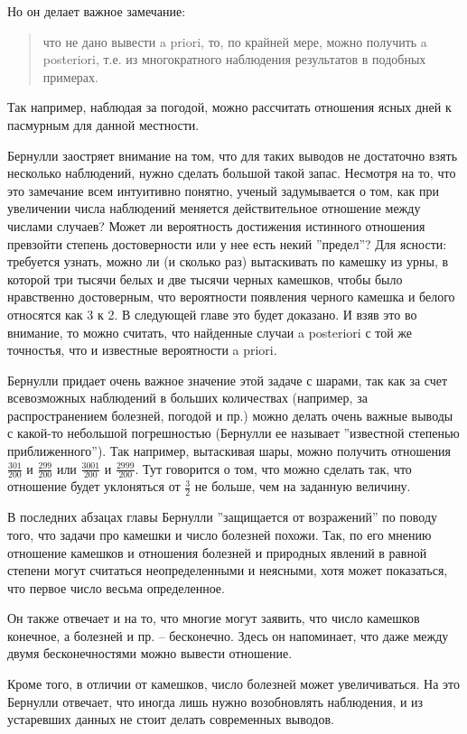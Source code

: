 \documentclass[12pt]{article}
\begin{document}
Но он делает важное замечание:
\begin{quote}
что не дано вывести a priori, то, по крайней мере, можно получить a posteriori, т.е. из многократного наблюдения результатов в подобных примерах.
\end{quote}
Так например, наблюдая за погодой, можно рассчитать отношения ясных дней к пасмурным для данной местности.

Бернулли заостряет внимание на том, что для таких выводов не достаточно взять несколько наблюдений, нужно сделать большой такой запас. 
Несмотря на то, что это замечание всем интуитивно понятно, ученый задумывается о том, как при увеличении числа наблюдений меняется действительное отношение между числами случаев? 
Может ли вероятность достижения истинного отношения превзойти степень достоверности или у нее есть некий ''предел''?
Для ясности: требуется узнать, можно ли (и сколько раз) вытаскивать по камешку из урны, в которой три тысячи белых и две тысячи черных камешков, чтобы было нравственно достоверным, что вероятности появления черного камешка и белого относятся как 3 к 2.
В следующей главе это будет доказано.
И взяв это во внимание, то можно считать, что найденные случаи a posteriori с той же точностья, что и известные вероятности a priori.

Бернулли придает очень важное значение этой задаче с шарами, так как за счет всевозможных наблюдений в больших количествах (например, за распространением болезней, погодой и пр.) можно делать очень важные выводы с какой-то небольшой погрешностью (Бернулли ее называет ''известной степенью приближенного'').
Так например, вытаскивая шары, можно получить отношения $\frac{301}{200}$ и $\frac{299}{200}$ или $\frac{3001}{200}$ и $\frac{2999}{200}$.
Тут говорится о том, что можно сделать так, что отношение будет уклоняться от $\frac{3}{2}$ не больше, чем на заданную величину.

В последних абзацах главы Бернулли ''защищается от возражений'' по поводу того, что задачи про камешки и число болезней похожи.
Так, по его мнению отношение камешков и отношения болезней и природных явлений в равной степени могут считаться неопределенными и неясными, хотя может показаться, что первое число весьма определенное.

Он также отвечает и на то, что многие могут заявить, что число камешков конечное, а болезней и пр. -- бесконечно.
Здесь он напоминает, что даже между двумя бесконечностями можно вывести отношение.

Кроме того, в отличии от камешков, число болезней может увеличиваться.
На это Бернулли отвечает, что иногда лишь нужно возобновлять наблюдения, и из устаревших данных не стоит делать современных выводов.
\end{document}
